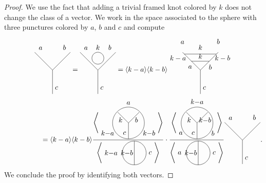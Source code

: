 \documentclass[pdftex]{sigma}
\numberwithin{equation}{section}
\begin{document}
\begin{proof}We use the fact that adding a trivial framed knot colored by $k$ does not change the class of a vector. We work in the space associated to the sphere with three punctures colored by $a$, $b$ and $c$ and compute
\begin{gather*}
\tikz[scale=0.3,baseline=-0.5ex]{
\draw (0,0)--(-3, 3);
\draw (0,0)--(3, 3);
\draw (0,-4)--(0,0);
\draw (-2,3) node[above]{$a$};
\draw (2,3) node[above]{$b$};
\draw (0,-3) node[right]{$c$};
}
=
\tikz[scale=0.3,baseline=-0.5ex]{
\draw (0,2) circle (1);
\draw (0,0)--(-3, 3);
\draw (0,0)--(3, 3);
\draw (0,-4)--(0,0);
\draw (-2,3) node[above]{$a$};
\draw (2,3) node[above]{$b$};
\draw (0,-3) node[right]{$c$};
\draw (0,3) node[above]{$k$};
} = \langle k-a\rangle \langle k-b\rangle
\tikz[scale=0.3,baseline=-0.5ex]{
\draw (0,0)--(-3, 3);
\draw (0,0)--(3, 3);
\draw (0,-4)--(0,0);
\draw (-1.5, 1.5)--(1.5,1.5);
\draw (-2.7,2.7)--(2.7,2.7);
\draw (-1,0.5) node[left]{$a$};
\draw (1, 0.5) node[right]{$b$};
\draw (0, 3) node[above]{$k$};
\draw (0, 1.5) node[above]{$k$};
\draw (-2,2) node[left]{$k-a$};
\draw (2,2) node[right]{$k-b$};
\draw (-3,4) node[above]{$a$};
\draw (3,4) node[above]{$b$};
\draw (0,-3) node[right]{$c$};
}
\\
 \hphantom{\tikz[scale=0.3,baseline=-0.5ex]{
\draw (0,0)--(-3, 3);
\draw (0,0)--(3, 3);
\draw (0,-4)--(0,0);
\draw (-2,3) node[above]{$a$};
\draw (2,3) node[above]{$b$};
\draw (0,-3) node[right]{$c$};
}}{}
 =
\langle k-a\rangle \langle k-b\rangle \frac{\left< \Tetahedrongraph{$a$}{$k$}{$b$}{$k{-}a$}{$c$}{$k{-}b$}\right>}{\left< \thetagraph{$k{-}a~$}{$k{-}b$}{$c$} \right>} \cdot \frac{\left< \Tetahedrongraph{$k{-}a$}{$k$}{$k{-}b$}{$a$}{$c$}{$b$}\right>}{\left< \thetagraph{$a~$}{$k{-}b$}{$c$} \right>}
\tikz[scale=0.3,baseline=-0.5ex]{
\draw (0,0)--(-3, 3);
\draw (0,0)--(3, 3);
\draw (0,-4)--(0,0);
\draw (-2,3) node[above]{$a$};
\draw (2,3) node[above]{$b$};
\draw (0,-3) node[right]{$c$};
}.
\end{gather*}
We conclude the proof by identifying both vectors.
\end{proof}
\end{document}
